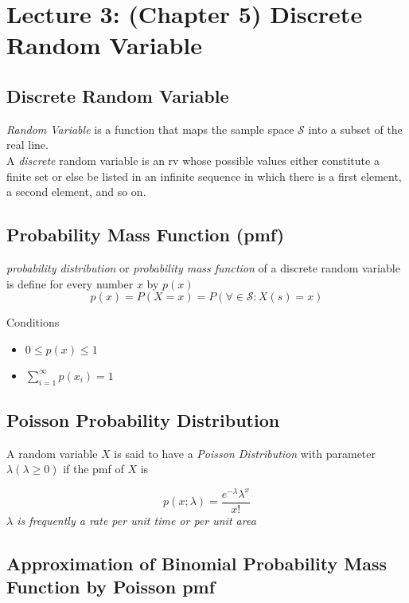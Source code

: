 \section{Lecture 3: (Chapter 5) Discrete Random Variable}
\subsection{Discrete Random Variable}
\emph{Random Variable} is a function that maps the sample space $\mathcal{S}$ into a subset of the real line.\\

A \emph{discrete} random variable is an rv whose possible values either constitute a finite set or else be listed in an infinite sequence in which there is a first element, a second element, and so on. 

\subsection{Probability Mass Function (pmf)}
\emph{probability distribution} or \emph{probability mass function} of a discrete random variable is define for every number $x$ by $p(x)$
\begin {equation*}
	p(x)=P(X=x)=P(\forall \in \mathcal{S}: X(s)=x)
\end{equation*}

Conditions 
\begin{itemize}
	\item $0 \leq p(x) \leq 1$
	\item $\sum^{\infty}_{i=1}p(x_{i})=1$
\end{itemize}

\subsection{Poisson Probability Distribution}
\label{pois}
A random variable $X$ is said to have a \emph{Poisson Distribution} with parameter $\lambda (\lambda \geq 0)$ if the pmf of $X$ is

\begin{equation*}
	p(x;\lambda)=\frac{e^{-\lambda} \lambda^{x}}{x!}
\end{equation*}
\emph{$\lambda$ is frequently a rate per unit time or per unit area}

\subsection{Approximation of Binomial Probability Mass Function by Poisson pmf}

